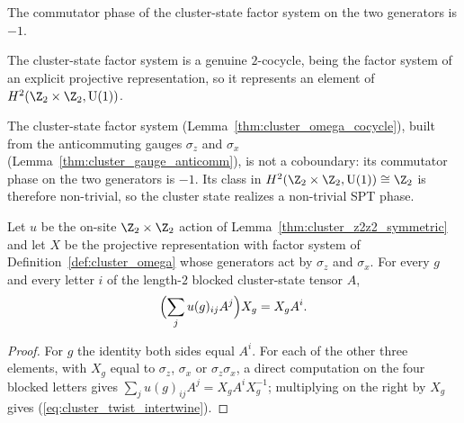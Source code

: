 \begin{lemma}\label{lem:cluster_comm_phase_neg_one}
    \leanok
    The commutator phase of the cluster-state factor system on the two generators
    is $-1$.
\end{lemma}

\begin{lemma}\label{thm:cluster_omega_cocycle}
    \leanok
    The cluster-state factor system is a genuine $2$-cocycle, being the factor
    system of an explicit projective representation, so it represents an element
    of $H^2(\Z_2 \times \Z_2, \mathrm{U}(1))$.
\end{lemma}

\begin{lemma}\label{thm:cluster_nontrivial_spt}
    \leanok
    The cluster-state factor system (Lemma~\ref{thm:cluster_omega_cocycle}),
    built from the anticommuting gauges $\sigma_z$ and $\sigma_x$
    (Lemma~\ref{thm:cluster_gauge_anticomm}), is not a coboundary: its
    commutator phase on the two generators is $-1$. Its class in
    $H^2(\Z_2 \times \Z_2, \mathrm{U}(1)) \cong \Z_2$ is therefore non-trivial, so
    the cluster state realizes a non-trivial SPT phase.
\end{lemma}

\begin{lemma}
    \label{thm:cluster_twist_intertwine}
    \leanok
    Let $u$ be the on-site $\Z_2\times\Z_2$ action of
    Lemma~\ref{thm:cluster_z2z2_symmetric} and let $X$ be the projective
    representation with factor system of Definition~\ref{def:cluster_omega} whose
    generators act by $\sigma_z$ and $\sigma_x$.  For every $g$ and every letter
    $i$ of the length-$2$ blocked cluster-state tensor $A$,
    \begin{align}
        \Bigl(\sum_j u(g)_{ij}A^j\Bigr)X_g=X_gA^i.
        \label{eq:cluster_twist_intertwine}
    \end{align}
\end{lemma}
\begin{proof}
    \leanok
    For $g$ the identity both sides equal $A^i$.  For each of the other three
    elements, with $X_g$ equal to $\sigma_z$, $\sigma_x$ or $\sigma_z\sigma_x$, a
    direct computation on the four blocked letters gives
    $\sum_ju(g)_{ij}A^j=X_gA^iX_g^{-1}$; multiplying on the right by $X_g$ gives
    (\ref{eq:cluster_twist_intertwine}).
\end{proof}


